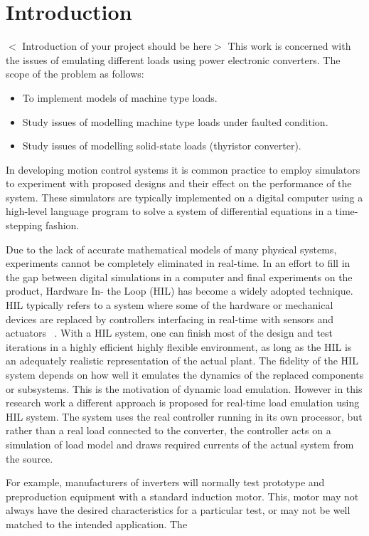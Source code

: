 \chapter{Introduction}
$<$ Introduction of your project should be here$>$\newline
This work is concerned with the issues of emulating different loads using power electronic converters. The scope of the problem as follows:
\begin{itemize}
\item To implement models of machine type loads.
\item Study issues of modelling machine type loads under faulted condition.
\item Study issues of modelling solid-state loads (thyristor converter).
\end{itemize}
In developing motion control systems it is common
practice to employ simulators to experiment with proposed designs and their effect on the performance of the system. These simulators are typically implemented
on a digital computer using a high-level language program to solve a system of differential equations in a time-stepping fashion. \par
Due to the lack of 
accurate mathematical models of many physical systems, experiments cannot be completely
eliminated in real-time. In an effort to fill in the gap between digital simulations in a computer and final
experiments on the product, Hardware In- the Loop (HIL) has become a widely adopted technique.
HIL typically refers to a system where some of the hardware or mechanical devices are replaced by
controllers interfacing in real-time with sensors and actuators ~\cite{peter}. With a HIL system, one can finish most of the design and test iterations in a highly efficient highly flexible environment, as long as the HIL is an adequately realistic representation of the actual plant. The fidelity of the HIL system depends on
how well it emulates the dynamics of the replaced components or subsystems. This is the motivation
of dynamic load emulation. However in this research work a different  approach is proposed for real-time load emulation using HIL system. The system  uses the real controller running in its own processor, but rather than a real load  connected to the converter, the controller acts on a simulation of load model  and draws required currents of the actual system from the source.\par 
 For example, manufacturers of inverters will normally test prototype and preproduction equipment with a standard induction motor. This, motor may not always have the desired characteristics for a particular test, or may  not be well matched to the intended application. The
